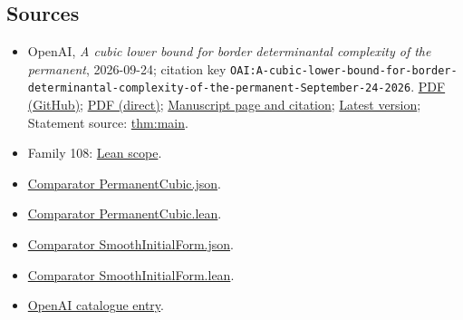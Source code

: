 \documentclass[11pt]{article}
\begin{document}
\subsection{Sources}
\begin{itemize}
\item OpenAI, \emph{A cubic lower bound for border determinantal complexity of the permanent}, 2026-09-24; citation key \texttt{OAI:A-cubic-lower-bound-for-border-determinantal-complexity-of-the-permanent-September-24-2026}. \href{https://github.com/openai/math/blob/adc7f1241b42e322a6451854ab7e4b4c146bf78a/preprints/A-cubic-lower-bound-for-border-determinantal-complexity-of-the-permanent-September-24-2026/A-cubic-lower-bound-for-border-determinantal-complexity-of-the-permanent-September-24-2026.pdf}{PDF (GitHub)}; \href{https://github.com/openai/math/raw/adc7f1241b42e322a6451854ab7e4b4c146bf78a/preprints/A-cubic-lower-bound-for-border-determinantal-complexity-of-the-permanent-September-24-2026/A-cubic-lower-bound-for-border-determinantal-complexity-of-the-permanent-September-24-2026.pdf}{PDF (direct)}; \href{https://github.com/openai/math/blob/adc7f1241b42e322a6451854ab7e4b4c146bf78a/preprints/A-cubic-lower-bound-for-border-determinantal-complexity-of-the-permanent-September-24-2026/README.md}{Manuscript page and citation}; \href{https://github.com/openai/math/blob/main/preprints/A-cubic-lower-bound-for-border-determinantal-complexity-of-the-permanent-September-24-2026/A-cubic-lower-bound-for-border-determinantal-complexity-of-the-permanent-September-24-2026.pdf}{Latest version}; Statement source: \href{https://github.com/openai/math/blob/adc7f1241b42e322a6451854ab7e4b4c146bf78a/preprints/A-cubic-lower-bound-for-border-determinantal-complexity-of-the-permanent-September-24-2026/build/source/sections/introduction.tex\#L41}{thm:main}.
\item Family 108: \href{https://github.com/openai/math/blob/adc7f1241b42e322a6451854ab7e4b4c146bf78a/lean/docs/108.md}{Lean scope}.
\item \href{https://github.com/openai/math/blob/adc7f1241b42e322a6451854ab7e4b4c146bf78a/lean/ComparatorChallenges/PermanentCubic.json}{Comparator PermanentCubic.json}.
\item \href{https://github.com/openai/math/blob/adc7f1241b42e322a6451854ab7e4b4c146bf78a/lean/ComparatorChallenges/PermanentCubic.lean}{Comparator PermanentCubic.lean}.
\item \href{https://github.com/openai/math/blob/adc7f1241b42e322a6451854ab7e4b4c146bf78a/lean/ComparatorChallenges/SmoothInitialForm.json}{Comparator SmoothInitialForm.json}.
\item \href{https://github.com/openai/math/blob/adc7f1241b42e322a6451854ab7e4b4c146bf78a/lean/ComparatorChallenges/SmoothInitialForm.lean}{Comparator SmoothInitialForm.lean}.
\item \href{https://github.com/openai/math/blob/adc7f1241b42e322a6451854ab7e4b4c146bf78a/CONTENTS.md}{OpenAI catalogue entry}.
\end{itemize}
\end{document}
